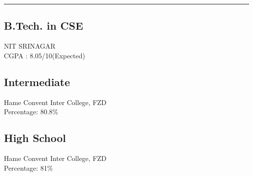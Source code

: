 
\noindent\rule{5cm}{0.4pt}
\vspace{0.2cm}

\subsection{B.Tech. in CSE}
NIT SRINAGAR \\
CGPA : 8.05/10(Expected)\\
\vspace{8pt}

\subsection{Intermediate}
Hame Convent Inter College, FZD\\
Percentage: 80.8\%\\
\vspace{8pt}

\subsection{High School}
Hame Convent Inter College, FZD\\
Percentage: 81\%\\
\vspace{8pt}
\sectionsep